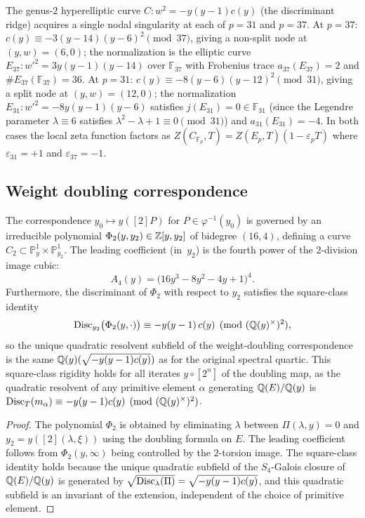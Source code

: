 \begin{remark}\label{rmk:disc-ridge-nodal}
The genus-$2$ hyperelliptic curve $C:w^2=-y(y-1)c(y)$ (the discriminant ridge) acquires a single nodal singularity at each of $p=31$ and $p=37$.
At $p=37$: $c(y)\equiv -3(y-14)(y-6)^2\pmod{37}$, giving a non-split node at $(y,w)=(6,0)$; the normalization is the elliptic curve $E_{37}:w'^2=3y(y-1)(y-14)$ over $\mathbb{F}_{37}$ with Frobenius trace $a_{37}(E_{37})=2$ and $\#E_{37}(\mathbb{F}_{37})=36$.
At $p=31$: $c(y)\equiv -8(y-6)(y-12)^2\pmod{31}$, giving a split node at $(y,w)=(12,0)$; the normalization $E_{31}:w'^2=-8y(y-1)(y-6)$ satisfies $j(E_{31})=0\in\mathbb{F}_{31}$ (since the Legendre parameter $\lambda\equiv 6$ satisfies $\lambda^2-\lambda+1\equiv 0\pmod{31}$) and $a_{31}(E_{31})=-4$.
In both cases the local zeta function factors as $Z(C_{\mathbb{F}_p},T)=Z(E_p,T)(1-\varepsilon_p T)$ where $\varepsilon_{31}=+1$ and $\varepsilon_{37}=-1$.
\end{remark}

\subsection{Weight doubling correspondence}

\begin{proposition}\label{prop:weight-doubling}
The correspondence $y_0\mapsto y([2]P)$ for $P\in\varphi^{-1}(y_0)$ is governed by an irreducible polynomial $\Phi_2(y,y_2)\in\mathbb{Z}[y,y_2]$ of bidegree $(16,4)$, defining a curve $C_2\subset\mathbb{P}^1_y\times\mathbb{P}^1_{y_2}$.
The leading coefficient (in~$y_2$) is the fourth power of the $2$-division image cubic:
\[
A_4(y)=\bigl(16y^3-8y^2-4y+1\bigr)^4.
\]
Furthermore, the discriminant of $\Phi_2$ with respect to $y_2$ satisfies the square-class identity
\[
\operatorname{Disc}_{y_2}\bigl(\Phi_2(y,\cdot)\bigr)\equiv -y(y-1)\,c(y)\pmod{(\mathbb{Q}(y)^\times)^2},
\]
so the unique quadratic resolvent subfield of the weight-doubling correspondence is the same $\mathbb{Q}(y)(\sqrt{-y(y-1)c(y)})$ as for the original spectral quartic.
This square-class rigidity holds for all iterates $y\circ[2^n]$ of the doubling map, as the quadratic resolvent of any primitive element $\alpha$ generating $\mathbb{Q}(E)/\mathbb{Q}(y)$ is $\operatorname{Disc}_T(m_\alpha)\equiv -y(y-1)c(y)\pmod{(\mathbb{Q}(y)^\times)^2}$.
\end{proposition}

\begin{proof}
The polynomial $\Phi_2$ is obtained by eliminating $\lambda$ between $\Pi(\lambda,y)=0$ and $y_2=y([2](\lambda,\xi))$ using the doubling formula on $E$.
The leading coefficient follows from $\Phi_2(y,\infty)$ being controlled by the $2$-torsion image.
The square-class identity holds because the unique quadratic subfield of the $S_4$-Galois closure of $\mathbb{Q}(E)/\mathbb{Q}(y)$ is generated by $\sqrt{\operatorname{Disc}_\lambda(\Pi)}=\sqrt{-y(y-1)c(y)}$, and this quadratic subfield is an invariant of the extension, independent of the choice of primitive element.
\end{proof}

